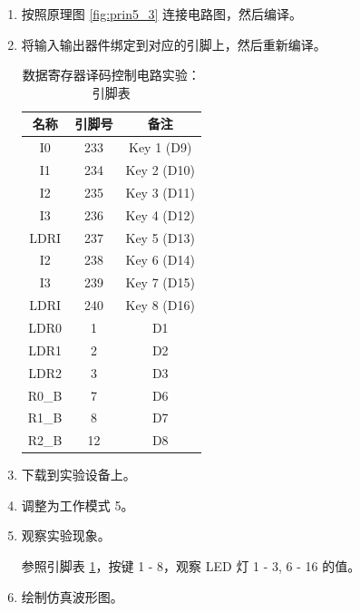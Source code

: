 \begin{enumerate}
    \item 按照原理图 \ref{fig:prin5_3} 连接电路图，然后编译。
    \item 将输入输出器件绑定到对应的引脚上，然后重新编译。
    
    \begin{table}[H]
        \centering
        \begin{tabular}{|c|c|c|}
            \hline
            名称 & 引脚号 & 备注 \\
            \hline
            I0 & 233 & Key 1 (D9) \\
            \hline
            I1 & 234 & Key 2 (D10) \\
            \hline
            I2 & 235 & Key 3 (D11) \\
            \hline
            I3 & 236 & Key 4 (D12) \\
            \hline
            LDRI & 237 & Key 5 (D13) \\
            \hline
            I2 & 238 & Key 6 (D14) \\
            \hline
            I3 & 239 & Key 7 (D15) \\
            \hline
            LDRI & 240 & Key 8 (D16) \\
            \hline
            LDR0 & 1 & D1 \\
            \hline
            LDR1 & 2 & D2 \\
            \hline
            LDR2 & 3 & D3 \\
            \hline
            R0\_B & 7 & D6 \\
            \hline
            R1\_B & 8 & D7 \\
            \hline
            R2\_B & 12 & D8 \\
            \hline
        \end{tabular}
        \caption{数据寄存器译码控制电路实验：引脚表}
        \label{tab:pin5_3}
    \end{table}
    
    \item 下载到实验设备上。
    \item 调整为工作模式 5。
    \item 观察实验现象。
    
    参照引脚表 \ref{tab:pin5_3}，按键 1 - 8，观察 LED 灯 1 - 3, 6 - 16 的值。
    
    \item 绘制仿真波形图。
\end{enumerate}

